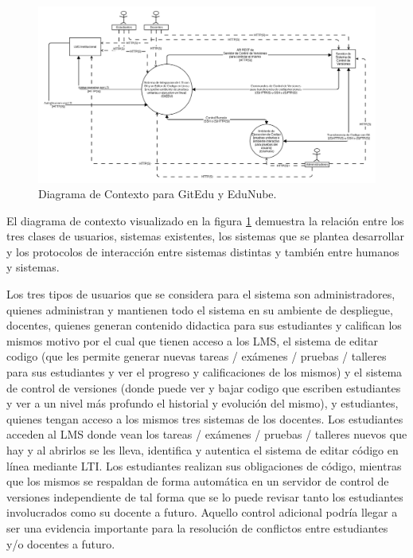 \begin{landscape}

	\begin{figure}
	  \begin{center}
	    \includegraphics[width=1.7\textwidth]{Figures/contexto.png}
	  \end{center}
	  \caption{Diagrama de Contexto para GitEdu y EduNube.}
	  \label{context}
	\end{figure}

\end{landscape}

El diagrama de contexto visualizado en la figura \ref{context} demuestra la relación entre los tres clases de usuarios, sistemas existentes, los sistemas que se plantea desarrollar y los protocolos de interacción entre sistemas distintas y también entre humanos y sistemas.

Los tres tipos de usuarios que se considera para el sistema son administradores, quienes administran y mantienen todo el sistema en su ambiente de despliegue, docentes, quienes generan contenido didactica para sus estudiantes y califican los mismos motivo por el cual que tienen acceso a los LMS, el sistema de editar codigo (que les permite generar nuevas tareas / exámenes / pruebas / talleres para sus estudiantes y ver el progreso y calificaciones de los mismos) y el sistema de control de versiones (donde puede ver y bajar codigo que escriben estudiantes y ver a un nivel más profundo el historial y evolución del mismo), y estudiantes, quienes tengan acceso a los mismos tres sistemas de los docentes. Los estudiantes acceden al LMS donde vean los tareas / exámenes / pruebas / talleres nuevos que hay y al abrirlos se les lleva, identifica y autentica el sistema de editar código en línea mediante LTI. Los estudiantes realizan sus obligaciones de código, mientras que los mismos se respaldan de forma automática en un servidor de control de versiones independiente de tal forma que se lo puede revisar tanto los estudiantes involucrados como su docente a futuro. Aquello control adicional podría llegar a ser una evidencia importante para la resolución de conflictos entre estudiantes y/o docentes a futuro.

